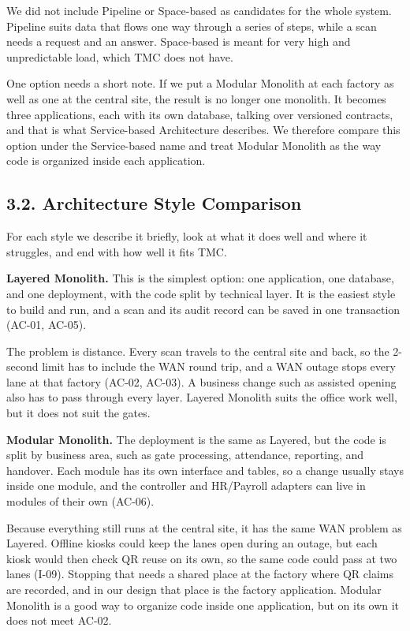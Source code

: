 We did not include Pipeline or Space-based as candidates for the whole system. Pipeline suits data that flows one way through a series of steps, while a scan needs a request and an answer. Space-based is meant for very high and unpredictable load, which TMC does not have.

One option needs a short note. If we put a Modular Monolith at each factory as well as one at the central site, the result is no longer one monolith. It becomes three applications, each with its own database, talking over versioned contracts, and that is what Service-based Architecture describes. We therefore compare this option under the Service-based name and treat Modular Monolith as the way code is organized inside each application.

\subsection*{3.2. Architecture Style Comparison}

{}

For each style we describe it briefly, look at what it does well and where it struggles, and end with how well it fits TMC.

\noindent\textbf{Layered Monolith.} This is the simplest option: one application, one database, and one deployment, with the code split by technical layer. It is the easiest style to build and run, and a scan and its audit record can be saved in one transaction (AC-01, AC-05).

The problem is distance. Every scan travels to the central site and back, so the 2-second limit has to include the WAN round trip, and a WAN outage stops every lane at that factory (AC-02, AC-03). A business change such as assisted opening also has to pass through every layer. Layered Monolith suits the office work well, but it does not suit the gates.

\noindent\textbf{Modular Monolith.} The deployment is the same as Layered, but the code is split by business area, such as gate processing, attendance, reporting, and handover. Each module has its own interface and tables, so a change usually stays inside one module, and the controller and HR/Payroll adapters can live in modules of their own (AC-06).

Because everything still runs at the central site, it has the same WAN problem as Layered. Offline kiosks could keep the lanes open during an outage, but each kiosk would then check QR reuse on its own, so the same code could pass at two lanes (I-09). Stopping that needs a shared place at the factory where QR claims are recorded, and in our design that place is the factory application. Modular Monolith is a good way to organize code inside one application, but on its own it does not meet AC-02.

